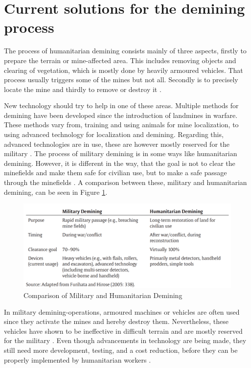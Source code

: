 \section{Current solutions for the demining process}

The process of humanitarian demining consists mainly of three aspects, firstly to prepare the terrain or mine-affected area. This includes removing objects and clearing of vegetation, which is mostly done by heavily armoured vehicles. That process usually triggers some of the mines but not all. Secondly is to precisely locate the mine and thirdly to remove or destroy it \cite{HiddenKillers2019}.

New technology should try to help in one of these areas. Multiple methods for demining have been developed since the introduction of landmines in warfare. These methods vary from, training and using animals for mine localization, to using advanced technology for localization and demining. Regarding this, advanced technologies are in use, these are however mostly reserved for the military \cite{HiddenKillers2019}.
The process of military demining is in some ways like humanitarian demining. However, it is different in the way, that the goal is not to clear the minefields and make them safe for civilian use, but to make a safe passage through the minefields \cite{HiddenKillers2019}. A comparison between these, military and humanitarian demining, can be seen in Figure \ref{fig:military_humanitarian_demining}.

\medskip

\begin{figure}[h]
  \centering
      \includegraphics[width=1\textwidth]{00 - Images/military_humanitarian_demining.png}
  \caption{Comparison of Military and Humanitarian Demining \cite{HiddenKillers2019}}
  \label{fig:military_humanitarian_demining}
\end{figure}

In military demining-operations, armoured machines or vehicles are often used since they activate the mines and hereby destroy them. Nevertheless, these vehicles have shown to be ineffective in difficult terrain and are mostly reserved for the military \cite{6LeggedRobot2007}. Even though advancements in technology are being made, they still need more development, testing, and a cost reduction, before they can be properly implemented by humanitarian workers \cite{HiddenKillers2019}. 


